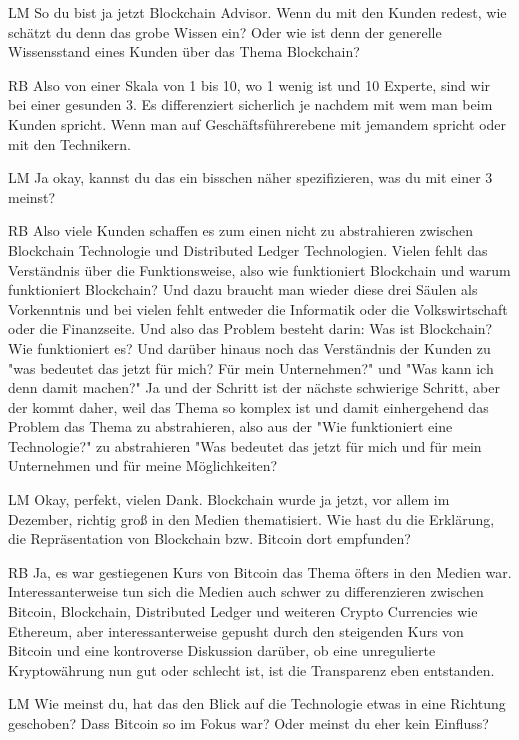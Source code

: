 \begin{xlist}
 \item[LM] So du bist ja jetzt Blockchain Advisor. Wenn du mit den Kunden redest, wie schätzt du denn das grobe Wissen ein? Oder wie ist denn der generelle Wissensstand eines Kunden über das Thema Blockchain?
 \item[RB] Also von einer Skala von 1 bis 10, wo 1 wenig ist und 10 Experte, sind wir bei einer gesunden 3. Es differenziert sicherlich je nachdem mit wem man beim Kunden spricht. Wenn man auf Geschäftsführerebene mit jemandem spricht oder mit den Technikern.
 \item[LM] Ja okay, kannst du das ein bisschen näher spezifizieren, was du mit einer 3 meinst?
 \item[RB] Also viele Kunden schaffen es zum einen nicht zu abstrahieren zwischen Blockchain Technologie und Distributed Ledger Technologien. Vielen fehlt das Verständnis über die Funktionsweise, also wie funktioniert Blockchain und warum funktioniert Blockchain? Und dazu braucht man wieder diese drei Säulen als Vorkenntnis und bei vielen fehlt entweder die Informatik oder die Volkswirtschaft oder die Finanzseite.  Und also das Problem besteht darin: Was ist Blockchain? Wie funktioniert es? Und darüber hinaus noch das Verständnis der Kunden zu "was bedeutet das jetzt für mich? Für mein Unternehmen?" und "Was kann ich denn damit machen?" Ja und der Schritt ist der nächste schwierige Schritt, aber der kommt daher, weil das Thema so komplex ist und damit einhergehend das Problem das Thema zu abstrahieren, also aus der "Wie funktioniert eine Technologie?" zu abstrahieren "Was bedeutet das jetzt für mich und für mein Unternehmen und für meine Möglichkeiten?
 \item[LM] Okay, perfekt, vielen Dank. Blockchain wurde ja jetzt, vor allem im Dezember, richtig groß in den Medien thematisiert. Wie hast du die Erklärung, die Repräsentation von Blockchain bzw. Bitcoin dort empfunden?
 \item[RB] Ja, es war gestiegenen Kurs von Bitcoin das Thema öfters in den Medien war. Interessanterweise tun sich die Medien auch schwer zu differenzieren zwischen Bitcoin, Blockchain, Distributed Ledger und weiteren Crypto Currencies wie Ethereum, aber interessanterweise gepusht durch den steigenden Kurs von Bitcoin und eine kontroverse Diskussion darüber, ob eine unregulierte Kryptowährung nun gut oder schlecht ist, ist die Transparenz eben entstanden.
 \item[LM] Wie meinst du, hat das den Blick auf die Technologie etwas in eine Richtung geschoben? Dass Bitcoin so im Fokus war? Oder meinst du eher kein Einfluss?

\end{xlist}

